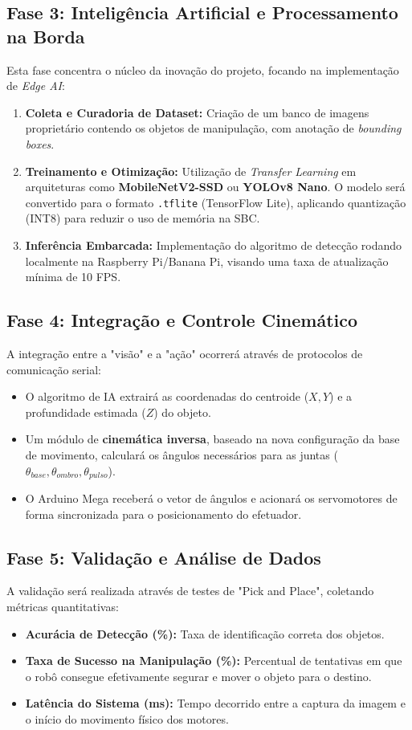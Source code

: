 \subsection*{Fase 3: Inteligência Artificial e Processamento na Borda}
Esta fase concentra o núcleo da inovação do projeto, focando na implementação de \textit{Edge AI}:
\begin{enumerate}
    \item \textbf{Coleta e Curadoria de Dataset:} Criação de um banco de imagens proprietário contendo os objetos de manipulação, com anotação de \textit{bounding boxes}.
    \item \textbf{Treinamento e Otimização:} Utilização de \textit{Transfer Learning} em arquiteturas como \textbf{MobileNetV2-SSD} ou \textbf{YOLOv8 Nano}. O modelo será convertido para o formato \texttt{.tflite} (TensorFlow Lite), aplicando quantização (INT8) para reduzir o uso de memória na SBC.
    \item \textbf{Inferência Embarcada:} Implementação do algoritmo de detecção rodando localmente na Raspberry Pi/Banana Pi, visando uma taxa de atualização mínima de 10 FPS.
\end{enumerate}

\subsection*{Fase 4: Integração e Controle Cinemático}
A integração entre a "visão" e a "ação" ocorrerá através de protocolos de comunicação serial:
\begin{itemize}
    \item O algoritmo de IA extrairá as coordenadas do centroide ($X, Y$) e a profundidade estimada ($Z$) do objeto.
    \item Um módulo de \textbf{cinemática inversa}, baseado na nova configuração da base de movimento, calculará os ângulos necessários para as juntas ($\theta_{base}, \theta_{ombro}, \theta_{pulso}$).
    \item O Arduino Mega receberá o vetor de ângulos e acionará os servomotores de forma sincronizada para o posicionamento do efetuador.
\end{itemize}

\subsection*{Fase 5: Validação e Análise de Dados}
A validação será realizada através de testes de "Pick and Place", coletando métricas quantitativas:
\begin{itemize}
    \item \textbf{Acurácia de Detecção (\%):} Taxa de identificação correta dos objetos.
    \item \textbf{Taxa de Sucesso na Manipulação (\%):} Percentual de tentativas em que o robô consegue efetivamente segurar e mover o objeto para o destino.
    \item \textbf{Latência do Sistema (ms):} Tempo decorrido entre a captura da imagem e o início do movimento físico dos motores.
\end{itemize}

